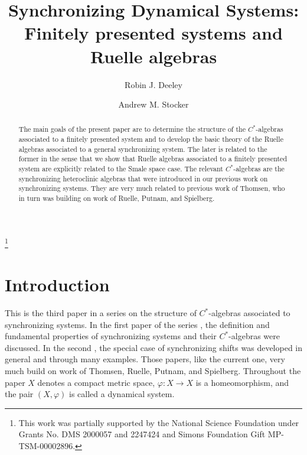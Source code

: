 \documentclass{amsart}
\theoremstyle{plain}
\theoremstyle{definition}
\theoremstyle{remark}
\begin{document}
\title[Finitely presented systems and Ruelle algebras]{Synchronizing Dynamical Systems: Finitely presented systems and Ruelle algebras}
\author{Robin J. Deeley}
\address{Robin J. Deeley,   Department of Mathematics,
University of Colorado Boulder
Campus Box 395,
Boulder, CO 80309-0395, USA }
\author{Andrew M. Stocker}
\address{Andrew M. Stocker,   Department of Mathematics,
University of Colorado Boulder
Campus Box 395,
Boulder, CO 80309-0395, USA }
\thanks{This work was partially supported by the National Science Foundation under Grants No. DMS 2000057 and 2247424 and Simons Foundation Gift MP-TSM-00002896.}
\begin{abstract}
The main goals of the present paper are to determine the structure of the $C^\ast$-algebras associated to a finitely presented system and to develop the basic theory of the Ruelle algebras associated to a general synchronizing system. The later is related to the former in the sense that we show that Ruelle algebras associated to a finitely presented system are explicitly related to the Smale space case. The relevant $C^\ast$-algebras are the synchronizing heteroclinic algebras that were introduced in our previous work on synchronizing systems. They are very much related to previous work of Thomsen, who in turn was building on work of Ruelle, Putnam, and Spielberg. 
\end{abstract}

\maketitle


\section*{Introduction}
This is the third paper in a series on the structure of $C^\ast$-algebras associated to synchronizing systems. In the first paper of the series \cite{DeeSto}, the definition and fundamental properties of synchronizing systems and their $C^\ast$-algebras were discussed. In the second \cite{DeeStoShift}, the special case of synchronizing shifts was developed in general and through many examples. Those papers, like the current one, very much build on work of Thomsen, Ruelle, Putnam, and Spielberg. Throughout the paper $X$ denotes a compact metric space, $\varphi: X \rightarrow X$ is a homeomorphism, and the pair $(X, \varphi)$ is called a dynamical system. 
\end{document}
